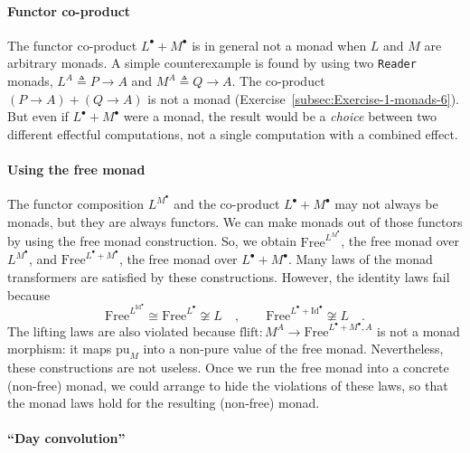 \paragraph{Functor co-product}

The functor co-product $L^{\bullet}+M^{\bullet}$ is in general not
a monad when $L$ and $M$ are arbitrary monads. A simple counterexample
is found by using two \lstinline!Reader! monads, $L^{A}\triangleq P\rightarrow A$
and $M^{A}\triangleq Q\rightarrow A$. The co-product $\left(P\rightarrow A\right)+\left(Q\rightarrow A\right)$
is not a monad (Exercise~\ref{subsec:Exercise-1-monads-6}). But
even if $L^{\bullet}+M^{\bullet}$ were a monad, the result would
be a \emph{choice} between two different effectful computations, not
a single computation with a combined effect.

\paragraph{Using the free monad}

The functor composition $L^{M^{\bullet}}$ and the co-product $L^{\bullet}+M^{\bullet}$
may not always be monads, but they are always functors. We can make
monads out of those functors by using the free monad construction.
So, we obtain $\text{Free}^{L^{M^{\bullet}}}$, the free monad over
$L^{M^{\bullet}}$, and $\text{Free}^{L^{\bullet}+M^{\bullet}}$,
the free monad over $L^{\bullet}+M^{\bullet}$. Many laws of the monad
transformers are satisfied by these constructions. However, the identity
laws fail because
\[
\text{Free}^{L^{\text{Id}^{\bullet}}}\cong\text{Free}^{L^{\bullet}}\not\cong L\quad,\quad\quad\text{Free}^{L^{\bullet}+\text{Id}^{\bullet}}\not\cong L\quad.
\]
The lifting laws are also violated because $\text{flift}:M^{A}\rightarrow\text{Free}^{L^{\bullet}+M^{\bullet},A}$
is not a monad morphism: it maps $\text{pu}_{M}$ into a non-pure
value of the free monad. Nevertheless, these constructions are not
useless. Once we run the free monad into a concrete (non-free) monad,
we could arrange to hide the violations of these laws, so that the
monad laws hold for the resulting (non-free) monad.

\paragraph{\textsf{``}Day convolution\textsf{''}}

